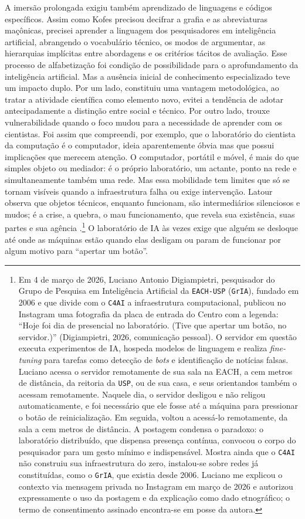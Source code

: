 A imersão prolongada exigiu também aprendizado de linguagens e códigos específicos. Assim como Kofes precisou decifrar a grafia e as abreviaturas maçônicas, precisei aprender a linguagem dos pesquisadores em inteligência artificial, abrangendo o vocabulário técnico, os modos de argumentar, as hierarquias implícitas entre abordagens e os critérios tácitos de avaliação. Esse processo de alfabetização foi condição de possibilidade para o aprofundamento da inteligência artificial. Mas a ausência inicial de conhecimento especializado teve um impacto duplo. Por um lado, constituiu uma vantagem metodológica, ao tratar a atividade científica como elemento novo, evitei a tendência de adotar antecipadamente a distinção entre social e técnico. Por outro lado, trouxe vulnerabilidade quando o foco mudou para a necessidade de aprender com os cientistas. Foi assim que compreendi, por exemplo, que o laboratório do cientista da computação é o computador, ideia aparentemente óbvia mas que possui implicações que merecem atenção. O computador, portátil e móvel, é mais do que simples objeto ou mediador: é o próprio laboratório, um actante, ponto na rede e simultaneamente também uma rede. Mas essa mobilidade tem limites que só se tornam visíveis quando a infraestrutura falha ou exige intervenção. Latour observa que objetos técnicos, enquanto funcionam, são intermediários silenciosos e mudos; é a crise, a quebra, o mau funcionamento, que revela sua existência, suas partes e sua agência \parencite[cap.~6]{Latour2017Esperanca}.\footnote{Em 4 de março de 2026, Luciano Antonio Digiampietri, pesquisador do Grupo de Pesquisa em Inteligência Artificial da \texttt{EACH-USP} (\texttt{GrIA}), fundado em 2006 e que divide com o \texttt{C4AI} a infraestrutura computacional, publicou no Instagram uma fotografia da placa de entrada do Centro com a legenda: \enquote{Hoje foi dia de presencial no laboratório. (Tive que apertar um botão, no servidor.)} (Digiampietri, 2026, comunicação pessoal). O servidor em questão executa experimentos de IA, hospeda modelos de linguagem e realiza \textit{fine-tuning} para tarefas como detecção de \textit{bots} e identificação de notícias falsas. Luciano acessa o servidor remotamente de sua sala na EACH, a cem metros de distância, da reitoria da \texttt{USP}, ou de sua casa, e seus orientandos também o acessam remotamente. Naquele dia, o servidor desligou e não religou automaticamente, e foi necessário que ele fosse até a máquina para pressionar o botão de reinicialização. Em seguida, voltou a acessá-lo remotamente, da sala a cem metros de distância. A postagem condensa o paradoxo: o laboratório distribuído, que dispensa presença contínua, convocou o corpo do pesquisador para um gesto mínimo e indispensável. Mostra ainda que o \texttt{C4AI} não construiu sua infraestrutura do zero, instalou-se sobre redes já constituídas, como o \texttt{GrIA}, que existia desde 2006. Luciano me explicou o contexto via mensagem privada no Instagram em março de 2026 e autorizou expressamente o uso da postagem e da explicação como dado etnográfico; o termo de consentimento assinado encontra-se em posse da autora.} O laboratório de IA às vezes exige que alguém se desloque até onde as máquinas estão quando elas desligam ou param de funcionar por algum motivo para \enquote{apertar um botão}.

